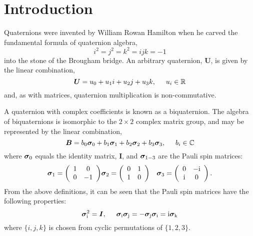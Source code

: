 \documentclass[12pt]{article}
\newcommand{\Ci}{{\rm i}}
\newcommand{\C}{\mathbb{C}}
\newcommand{\R}{\mathbb{R}}
\newcommand{\pauli}[1]{\ensuremath{ {\bm\sigma}_{\rm #1} }}
\begin{document}
\section{Introduction}

Quaternions were invented by William Rowan Hamilton when he carved the
fundamental formula of quaternion algebra,
\begin{equation}
i^2=j^2=k^2=ijk=-1
\end{equation}
into the stone of the Brougham bridge.
An arbitrary quaternion, $\bm{U}$, is given by the linear combination,
\begin{equation}
\bm{U}=u_0+u_1i+u_2j+u_3k, \hspace{5mm} u_i\in\R
\end{equation}
and, as with matrices, quaternion multiplication is non-commutative.

A quaternion with complex coefficients is known as a biquaternion.
The algebra of biquaternions is isomorphic to the $2\times2$ complex
matrix group, and may be
represented by the linear combination,
\begin{equation}
\bm{B}=b_0\pauli{0}+b_1\pauli{1}+b_2\pauli{2}+b_3\pauli{3},\hspace{5mm}b_i\in\C
\end{equation}
where $\pauli{0}$ equals the identity matrix, $\bm{I}$, and $\pauli{1-3}$
are the Pauli spin matrices:
\begin{eqnarray}
\pauli{1} = \left( \begin{array}{cc}
1 & 0 \\
0 & -1 
\end{array}\right)
&
\pauli{2} = \left( \begin{array}{cc}
0 & 1 \\
1 & 0 
\end{array}\right)
& 
\pauli{3} = \left( \begin{array}{cc}
0 & -\Ci \\
\Ci & 0
\end{array}\right).
\label{eqn:pauli}
\end{eqnarray}
From the above definitions, it can be seen that the Pauli spin
matrices have the following properties:
\begin{equation}\label{eqn:properties}
\pauli{i}^2 = \bm{I}, \hspace{5mm} 
\pauli{i}\pauli{j} = -\pauli{j}\pauli{i} = \Ci\pauli{k}
\end{equation}
where $\{i,j,k\}$ is chosen from cyclic permutations of $\{1,2,3\}$.
\end{document}
